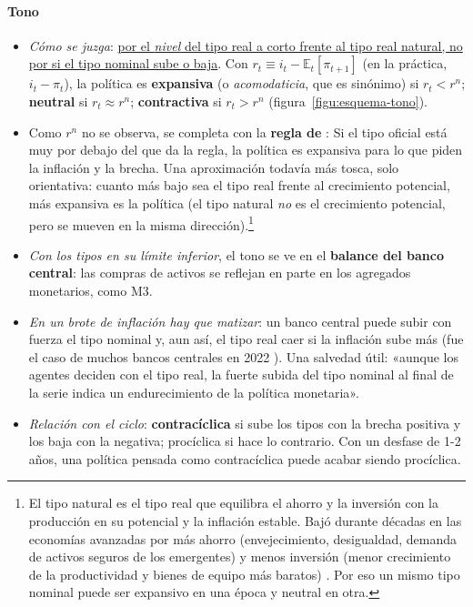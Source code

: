 \documentclass[11pt]{article}
\begin{document}
\paragraph{Tono}
\begin{itemize}
\item \emph{Cómo se juzga}: \uline{por el \emph{nivel} del tipo real a corto frente al tipo real natural, no por si el tipo nominal sube o baja}. Con $r_t\equiv i_t-\mathbb{E}_t[\pi_{t+1}]$ (en la práctica, $i_t-\pi_t$), la política es \textbf{expansiva} (o \emph{acomodaticia}, que es sinónimo) si $r_t<r^n$; \textbf{neutral} si $r_t\approx r^n$; \textbf{contractiva} si $r_t>r^n$ (figura~\ref{figu:esquema-tono}).
\item Como $r^n$ no se observa, se completa con la \textbf{regla de } \parencite{Taylor1993}:
  Si el tipo oficial está muy por debajo del que da la regla, la política es expansiva para lo que piden la inflación y la brecha. Una aproximación todavía más tosca, solo orientativa: cuanto más bajo sea el tipo real frente al crecimiento potencial, más expansiva es la política (el tipo natural \emph{no} es el crecimiento potencial, pero se mueven en la misma dirección).\footnote{El tipo natural es el tipo real que equilibra el ahorro y la inversión con la producción en su potencial y la inflación estable. Bajó durante décadas en las economías avanzadas por más ahorro (envejecimiento, desigualdad, demanda de activos seguros de los emergentes) y menos inversión (menor crecimiento de la productividad y bienes de equipo más baratos) \parencite{RachelSmith2017}. Por eso un mismo tipo nominal puede ser expansivo en una época y neutral en otra.}
\item \emph{Con los tipos en su límite inferior}, el tono se ve en el \textbf{balance del banco central}: las compras de activos se reflejan en parte en los agregados monetarios, como M3.
\item \emph{En un brote de inflación hay que matizar}: un banco central puede subir con fuerza el tipo nominal y, aun así, el tipo real caer si la inflación sube más (fue el caso de muchos bancos centrales en 2022 \parencite{BPI2022Inflacion}). Una salvedad útil: «aunque los agentes deciden con el tipo real, la fuerte subida del tipo nominal al final de la serie indica un endurecimiento de la política monetaria».
\item \emph{Relación con el ciclo}: \textbf{contracíclica} si sube los tipos con la brecha positiva y los baja con la negativa; procíclica si hace lo contrario. Con un desfase de 1-2 años, una política pensada como contracíclica puede acabar siendo procíclica.
\end{itemize}
\end{document}
